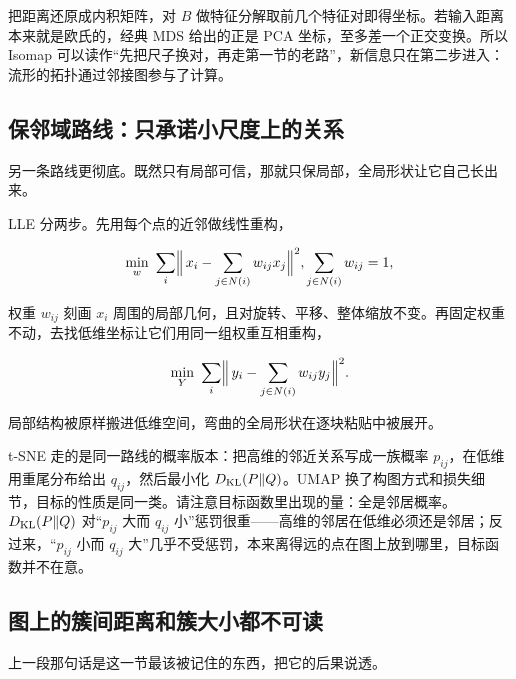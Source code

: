 把距离还原成内积矩阵，对 \(B\) 做特征分解取前几个特征对即得坐标。若输入距离本来就是欧氏的，经典 MDS 给出的正是 PCA 坐标，至多差一个正交变换。所以 Isomap 可以读作``先把尺子换对，再走第一节的老路''，新信息只在第二步进入：流形的拓扑通过邻接图参与了计算。

\subsection{保邻域路线：只承诺小尺度上的关系}

另一条路线更彻底。既然只有局部可信，那就只保局部，全局形状让它自己长出来。

LLE 分两步。先用每个点的近邻做线性重构，

\[
\min_{w}\ \sum_i\Bigl\|\,x_i-\sum_{j\in N(i)}w_{ij}x_j\Bigr\|^2,
\qquad \sum_{j\in N(i)}w_{ij}=1 ,
\]

权重 \(w_{ij}\) 刻画 \(x_i\) 周围的局部几何，且对旋转、平移、整体缩放不变。再固定权重不动，去找低维坐标让它们用同一组权重互相重构，

\[
\min_{Y}\ \sum_i\Bigl\|\,y_i-\sum_{j\in N(i)}w_{ij}y_j\Bigr\|^2 .
\]

局部结构被原样搬进低维空间，弯曲的全局形状在逐块粘贴中被展开。

t-SNE 走的是同一路线的概率版本：把高维的邻近关系写成一族概率 \(p_{ij}\)，在低维用重尾分布给出 \(q_{ij}\)，然后最小化 \(\KL(P\|Q)\)。UMAP 换了构图方式和损失细节，目标的性质是同一类。请注意目标函数里出现的量：全是邻居概率。\(\KL(P\|Q)\) 对``\(p_{ij}\) 大而 \(q_{ij}\) 小''惩罚很重——高维的邻居在低维必须还是邻居；反过来，``\(p_{ij}\) 小而 \(q_{ij}\) 大''几乎不受惩罚，本来离得远的点在图上放到哪里，目标函数并不在意。

\subsection{图上的簇间距离和簇大小都不可读}

上一段那句话是这一节最该被记住的东西，把它的后果说透。

